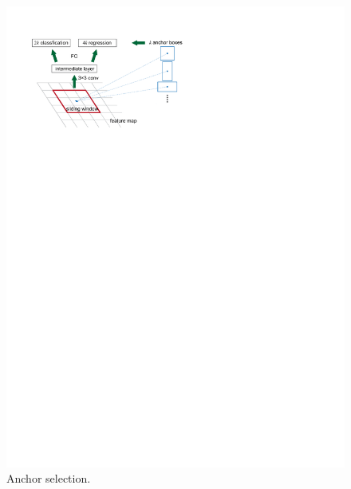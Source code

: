 \begin{figure}[!h]
	\centering
	\includegraphics[width=\figfi\textwidth]{3-11.pdf}
    \caption[Anchor selection]{Anchor selection.}
    \label{fig:ancsel}
\end{figure}
